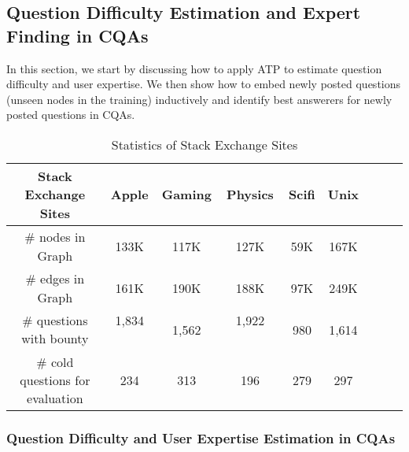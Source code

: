 \documentclass[letterpaper]{article} \usepackage{aaai19}  \usepackage{times}  \usepackage{helvet}  \usepackage{courier}  \usepackage{url}  \usepackage{graphicx}  \usepackage{booktabs} \usepackage{xcolor}
\begin{document}
\begin{comment}
    \item We can observe that ATP  SA-log, which shows the effectiveness of using our proposed method in Section~\ref{sec:inferring_graph_hierarchy} to infer graph hierarchy. It is worth mentioning that all the  graph hierarchy based methods perform better than HOPE, indicating that nodes' hierarchy is better proximity for asymmetric transitivity preservation than high order measures proposed by HOPE.
\end{itemize}
\end{comment}





\subsection{Question Difficulty Estimation and Expert Finding in CQAs}
\label{sec:question_routing_cqas}

In this section, we start by discussing how to apply ATP to estimate question difficulty and user expertise. We then show how to embed newly posted questions (unseen nodes in the training) inductively and identify best answerers for newly posted questions in CQAs.

\begin{table}[t!]
\small
\centering
\caption{Statistics of Stack Exchange Sites} 
\setlength\tabcolsep{1pt} \begin{tabular}{c|cccccccc}
Stack Exchange Sites 　　　&  Apple  & Gaming & Physics & Scifi  & Unix\\ \hline
\# nodes in Graph   　　　& 133K  & 117K & 127K & 59K &   167K\\
\# edges in Graph  　　　 & 161K   & 190K & 188K & 97K &   249K\\
\# questions with bounty  & 1,834  　 & 1,562 & 1,922 　　　& 980 &   1,614 \\
\# cold questions  for evaluation  & 234 & 313 & 196 & 279        & 297 \\ 
\bottomrule
\end{tabular}
\label{tab:statistics_stack_exchange}
\end{table}


\subsubsection{Question Difficulty and User Expertise Estimation in CQAs}
\end{document}
